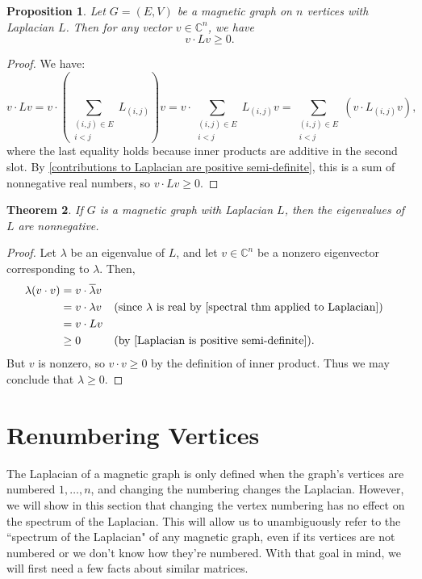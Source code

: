 \documentclass[12pt]{article}
\newtheorem{thm}{Theorem}
\newtheorem{prop}[thm]{Proposition}
\theoremstyle{definition}
\newcommand{\C}{\mathbb C}
\begin{document}
\begin{prop}\label{Laplacian is positive semi-definite}
Let $G=(E, V)$ be a magnetic graph on $n$ vertices with Laplacian $L$. Then for any vector $v \in \C^n$, we have 
$$v \cdot L v \geq 0.$$
\end{prop}
\begin{proof}
We have:
$$v \cdot Lv 
= v \cdot \left(\sum_{\substack{(i, j) \in E \\ i < j}} L_{(i, j)}\right)v
= v \cdot \sum_{\substack{(i, j) \in E \\ i < j}} L_{(i, j)} v = \sum_{\substack{(i, j) \in E \\ i < j}} \left(v \cdot L_{(i, j)} v\right),
$$
where the last equality holds because inner products are additive in the second slot. By \cref{contributions to Laplacian are positive semi-definite}, this is a sum of nonnegative real numbers, so $v \cdot Lv \geq 0$.
\end{proof}

\begin{thm}
If $G$ is a magnetic graph with Laplacian $L$, then the eigenvalues of $L$ are nonnegative.
\end{thm}
\begin{proof}
Let $\lambda$ be an eigenvalue of $L$, and let $v \in \C^n$ be a nonzero eigenvector corresponding to $\lambda$. Then,
\begin{align*}
\lambda (v \cdot v) &= v \cdot \overline\lambda v \\
&= v \cdot \lambda v &&\text{(since $\lambda$ is real by \cref{spectral thm applied to Laplacian})} \\
&= v \cdot L v \\
&\geq 0 &&\text{(by \cref{Laplacian is positive semi-definite})}. \\
\end{align*}
But $v$ is nonzero, so $v \cdot v \geq 0$ by the definition of inner product. Thus we may conclude that $\lambda \geq 0$.
\end{proof}

\section{Renumbering Vertices}

The Laplacian of a magnetic graph is only defined when the graph's vertices are numbered $1, \dots, n$, and changing the numbering changes the Laplacian. However, we will show in this section that changing the vertex numbering has no effect on the spectrum of the Laplacian. This will allow us to unambiguously refer to the ``spectrum of the Laplacian" of any magnetic graph, even if its vertices are not numbered or we don't know how they're numbered. With that goal in mind, we will first need a few facts about similar matrices.
\end{document}
